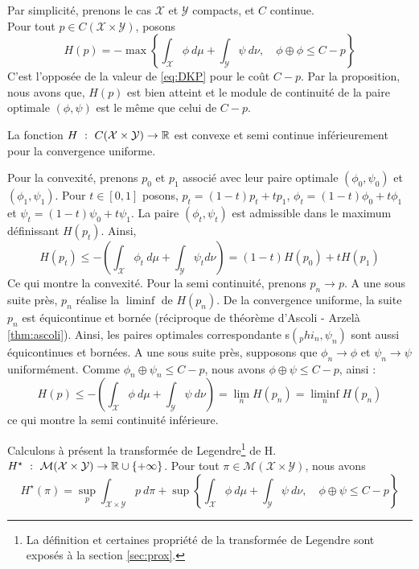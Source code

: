 \documentclass[a4paper,12pt]{article}
\begin{document}
\begin{preuve}
Par simplicité, prenons le cas $\mathcal{X}$ et $\mathcal{Y}$ compacts, et $C$ continue.\\
Pour tout $p\in C(\mathcal{X}\times\mathcal{Y})$, posons 
$$
H(p) = -\max\left\{\int_{\mathcal{X}} \phi\ d\mu +\int_{\mathcal{Y}} \psi\ d\nu, \quad \phi\oplus\phi\leq C-p\right\}
$$
C'est l'opposée de la valeur de \eqref{eq:DKP} pour le coût $C-p$. Par la proposition, nous avons que, $H(p)$ est bien atteint et le module de continuité de la paire optimale $(\phi,\psi)$ est le même que celui de $C-p$. 
\begin{lemme}
La fonction $H\ :\ C(\mathcal{X}\times\mathcal{Y})\rightarrow\RR$ est convexe et semi continue inférieurement pour la convergence uniforme.
\end{lemme}
\begin{preuve}
Pour la convexité, prenons $p_0$ et $p_1$ associé avec leur paire optimale $(\phi_0,\psi_0)$ et $(\phi_1,\psi_1)$. Pour $t\in [0,1]$ posons, $p_t=(1-t)p_t+tp_1$, $\phi_t=(1-t)\phi_0 + t\phi_1$ et $\psi_t=(1-t)\psi_0+t\psi_1$. La paire $(\phi_t,\psi_t)$ est admissible dans le maximum définissant $H(p_t)$. Ainsi, 
$$
H(p_t)\leq-\left(\int_{\mathcal{X}}\phi_t\ d\mu+\int_{\mathcal{Y}}\psi_t d\nu\right) = (1-t)H(p_0)+tH(p_1)
$$
Ce qui montre la convexité. Pour la semi continuité, prenons $p_n\rightarrow p$. A une sous suite près, $p_n$ réalise la $\liminf$ de $H(p_n)$. De la convergence uniforme, la suite $p_n$ est équicontinue et bornée (réciproque de théorème d'Ascoli - Arzelà \eqref{thm:ascoli}). Ainsi, les paires optimales correspondante s$(_phi_n,\psi_n)$ sont aussi équicontinues et bornées. A une sous suite près, supposons que $\phi_n\rightarrow\phi$ et $\psi_n\rightarrow\psi$ uniformément. Comme $\phi_n\oplus\psi_n\leq C-p$, nous avons $\phi\oplus\psi\leq C-p$, ainsi :
$$
H(p) \leq - \left(\int_{\mathcal{X}}\phi\ d\mu+\int_{\mathcal{Y}}\psi\ d\nu\right) = \lim_n H(p_n)=\liminf_n H(p_n)
$$
ce qui montre la semi continuité inférieure.
\end{preuve}
Calculons à présent la transformée de Legendre\footnote{La définition et certaines propriété de la transformée de Legendre sont exposés à la section \ref{sec:prox}.} de H. $H^{\star}\ :\ \mathcal{M}(\mathcal{X}\times\mathcal{Y})\rightarrow\RR\cup\{+\infty\}$. Pour tout $\pi\in\mathcal{M}(\mathcal{X}\times\mathcal{Y})$, nous avons 
$$
H^{\star}(\pi)= \sup_p \int_{\mathcal{X}\times\mathcal{Y}} p\ d\pi + \sup \left\{ \int_{\mathcal{X}}\phi\ d\mu + \int_{\mathcal{Y}}\psi\ d\nu, \quad \phi\oplus\psi\leq C- p \right\}
$$
\end{preuve}
\end{document}
